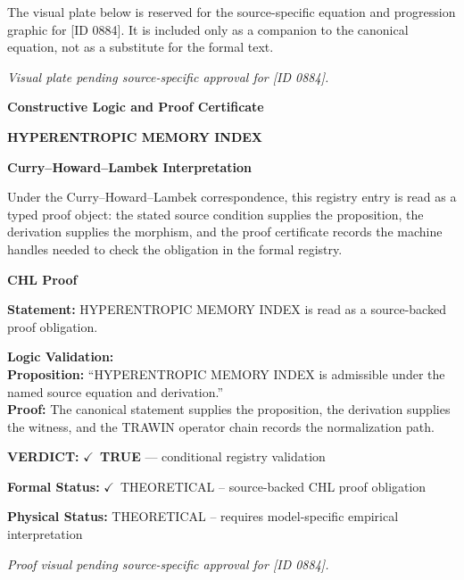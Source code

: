 \begingroup\footnotesize\sloppy
The visual plate below is reserved for the source-specific equation and progression graphic for [ID 0884]. It is included only as a companion to the canonical equation, not as a substitute for the formal text.
\par\endgroup
\begingroup\footnotesize\itshape
Visual plate pending source-specific approval for [ID 0884].
\par\endgroup

\clearpage
\begingroup\tzpsupportsetup
\noindent\textbf{\fontsize{10.8pt}{12.8pt}\selectfont [ID 0884] Constructive Logic and Proof Certificate}\par
\noindent\textbf{\fontsize{10pt}{12pt}\selectfont HYPERENTROPIC MEMORY INDEX}\par
\vspace{0.45em}
\begingroup
\footnotesize
\setlength{\parskip}{0.22em}
\setlength{\parindent}{0pt}
\noindent\textbf{Curry--Howard--Lambek Interpretation}\par
Under the Curry--Howard--Lambek correspondence, this registry entry is read as a typed proof
object: the stated source condition supplies the proposition, the derivation supplies the
morphism, and the proof certificate records the machine handles needed to check the obligation
in the formal registry.

\vspace{0.45em}
\noindent\textbf{CHL Proof}\par
\textbf{Statement:} HYPERENTROPIC MEMORY INDEX is read as a source-backed proof obligation.

\textbf{Logic Validation:}\\
\textbf{Proposition:} ``HYPERENTROPIC MEMORY INDEX is admissible under the named source equation and derivation.''\\
\textbf{Proof:} The canonical statement supplies the proposition, the derivation supplies the witness, and the TRAWIN operator chain records the normalization path.

\textbf{VERDICT:} \ensuremath{\checkmark}\ \textbf{TRUE} --- conditional registry validation

\textbf{Formal Status:} \ensuremath{\checkmark}\ THEORETICAL -- source-backed CHL proof obligation

\textbf{Physical Status:} THEORETICAL -- requires model-specific empirical interpretation
\par\vspace{0.45em}
\par
\vfill
\begingroup\footnotesize\itshape
Proof visual pending source-specific approval for [ID 0884].
\par\endgroup
\vfill
\endgroup
\endgroup
